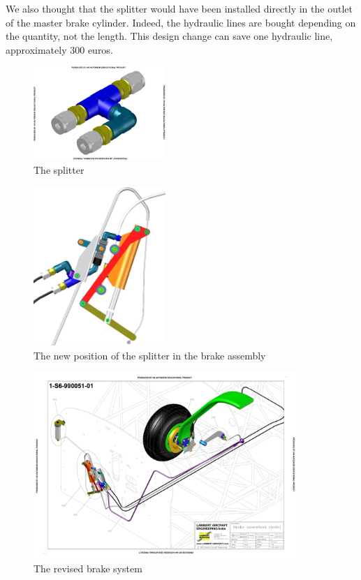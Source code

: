 \documentclass[11pt,a4paper]{article}
\begin{document}
We also thought that the splitter would have been installed directly in the outlet of the master brake cylinder. Indeed, the hydraulic lines are bought depending on the quantity, not the length. This design change can save one hydraulic line, approximately 300 euros.
\begin{figure}[ht!]
	\begin{center}
		\includegraphics[width=5cm,trim = 1cm 1cm 1cm 1cm, clip]{pics/PIC020.pdf}
		\caption{The splitter}
		\label{fig:PIC020}
	\end{center}
\end{figure}

\begin{figure}[ht!]
	\begin{center}
		\includegraphics[width=5cm]{pics/PIC022.jpg}
		\caption{The new position of the splitter in the brake assembly}
		\label{fig:PIC022}
	\end{center}
\end{figure}
\begin{figure}[ht!]
	\begin{center}
		\includegraphics[width=10cm,trim = 1.5cm 2cm 1.5cm 2cm, clip]{pics/PIC023.pdf}
		\caption{The revised brake system}
		\label{fig:PIC023}
	\end{center}
\end{figure}
\end{document}
